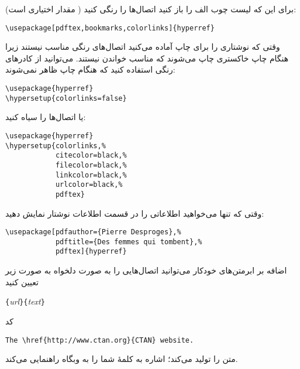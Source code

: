 {برای این که لیست چوب الف‌ را باز کنید  اتصال‌ها را رنگی کنید 
( مقدار   اختیاری است):
\begin{code}
\begin{verbatim}
\usepackage[pdftex,bookmarks,colorlinks]{hyperref}
\end{verbatim}
\end{code}

وقتی که نوشتار‌ی را برای چاپ آماده می‌کنید اتصال‌های رنگی مناسب نیستند زیرا هنگام چاپ خاکستری چاپ می‌شوند که مناسب خواندن نیستند. می‌توانید از کادرهای رنگی استفاده کنید که هنگام چاپ ظاهر نمی‌شوند:
\begin{code}
\begin{verbatim}
\usepackage{hyperref}
\hypersetup{colorlinks=false}
\end{verbatim}
\end{code}
\noindent یا اتصال‌ها را سیاه کنید:
\begin{code}
\begin{verbatim}
\usepackage{hyperref}
\hypersetup{colorlinks,%
            citecolor=black,%
            filecolor=black,%
            linkcolor=black,%
            urlcolor=black,%
            pdftex}
\end{verbatim}
\end{code}

وقتی که تنها می‌خواهید اطلاعاتی را در قسمت اطلاعات نوشتار نمایش دهید:
\begin{code}
\begin{verbatim}
\usepackage[pdfauthor={Pierre Desproges},%
            pdftitle={Des femmes qui tombent},%
            pdftex]{hyperref}
\end{verbatim}
\end{code}

\vspace{\baselineskip}

اضافه بر ابرمتن‌های خودکار می‌توانید اتصال‌هایی را به صورت دلخواه به صورت زیر تعیین کنید

\begin{lscommand}
\verb|{|\emph{url}\verb|}{|\emph{text}\verb|}|
\end{lscommand}

کد 

\begin{code}
\begin{verbatim}
The \href{http://www.ctan.org}{CTAN} website.
\end{verbatim}
\end{code}

متن  
 را تولید می‌کند؛ اشاره به کلمهٔ   شما را به وبگاه  راهنمایی می‌کند.

}
